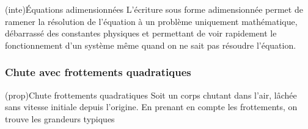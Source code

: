 \documentclass[../../main/main.tex]{subfiles}
\begin{document}
\begin{tcb}(inte){Équations adimensionnées}
	L'écriture sous forme adimensionnée permet de ramener la résolution de
	l'équation à un problème uniquement mathématique, débarrassé des constantes
	physiques et permettant de voir rapidement le fonctionnement d'un système même
	quand on ne sait pas résoudre l'équation.
\end{tcb}

\subsubsection{Chute avec frottements quadratiques}

\begin{tcb*}(prop){Chute frottements quadratiques}
	Soit un corps chutant dans l'air, lâchée sans vitesse
	initiale depuis l'origine. En prenant en compte les frottements,
	on trouve les grandeurs typiques
	\psw{%
		\[
			\boxed{V = \sqrt{\frac{mg}{\beta}}}
			\qet
			\boxed{T = \sqrt{\frac{m}{\beta g}}}
		\]
	}%
	\vspace{-15pt}
\end{tcb*}
\end{document}
